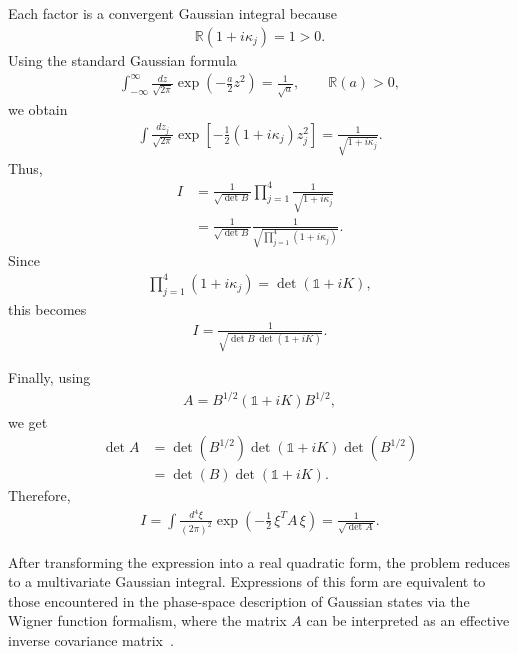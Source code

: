 \documentclass[%
 reprint,
 amsmath,amssymb,
 aps,
twocolumn
]{revtex4-2}
\begin{document}
Each factor is a convergent Gaussian integral because
\begin{align}
\mathbb{R}(1+i\kappa_j)=1>0.
\end{align}
Using the standard Gaussian formula
\begin{align}
\int_{-\infty}^{\infty}\frac{dz}{\sqrt{2\pi}}
\exp\!\left(-\frac{a}{2}z^2\right)
=
\frac{1}{\sqrt{a}},
\qquad
\mathbb{R}(a)>0,
\end{align}
we obtain
\begin{align}
\int \frac{dz_j}{\sqrt{2\pi}}
\exp\!\left[
-\frac12(1+i\kappa_j)z_j^2
\right]
=
\frac{1}{\sqrt{1+i\kappa_j}}.
\end{align}
Thus,
\begin{align}
I
&=
\frac{1}{\sqrt{\det B}}
\prod_{j=1}^4 \frac{1}{\sqrt{1+i\kappa_j}}\\
&=
\frac{1}{\sqrt{\det B}}
\frac{1}{\sqrt{\prod_{j=1}^4 (1+i\kappa_j)}}.
\end{align}
Since
\begin{align}
\prod_{j=1}^4 (1+i\kappa_j)
=
\det(\mathbb{1}+iK),
\end{align}
this becomes
\begin{align}
I
=
\frac{1}{\sqrt{\det B\,\det(\mathbb{1}+iK)}}.
\end{align}

Finally, using
\begin{align}
A
=
B^{1/2}\left(\mathbb{1}+iK\right)B^{1/2},
\end{align}
we get
\begin{align}
\det A
&=
\det(B^{1/2})\det(\mathbb{1}+iK)\det(B^{1/2})\\
&=
\det(B)\det(\mathbb{1}+iK).
\end{align}
Therefore,
\begin{align}
\boxed{
I
=
\int \frac{d^4\xi}{(2\pi)^2}
\exp\!\left(-\frac12\,\xi^T A\,\xi\right)
=
\frac{1}{\sqrt{\det A}}.
}
\end{align}

After transforming the expression into a real quadratic form, the problem reduces to a multivariate Gaussian integral. Expressions of this form are equivalent to those encountered in the phase-space description of Gaussian states via the Wigner function formalism, where the matrix $A$ can be interpreted as an effective inverse covariance matrix~\cite{ferraro2005gaussianstatescontinuousvariable,brask2022gaussianstatesoperations}.
\end{document}
